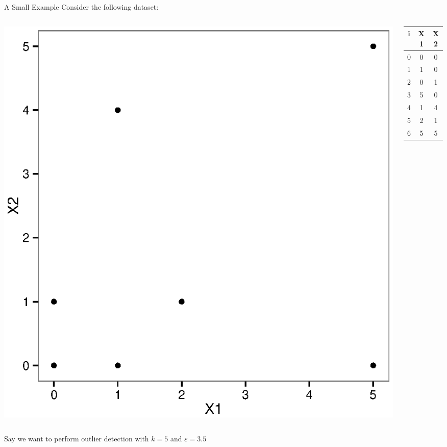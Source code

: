 \documentclass{beamer}
\begin{document}
\begin{frame}{A Small Example}
    Consider the following dataset:
    \begin{columns}
        \begin{column}{.7\textwidth}
            \includegraphics[width=.7\linewidth]{images/example_plot.eps}
        \end{column}
        \begin{column}{.3\textwidth}
            \begin{tabular}{ | c | c  c |}
            \hline
            i & X1 & X2 \\
            \hline
            0 & 0 & 0 \\
            1 & 1 & 0 \\
            2 & 0 & 1 \\
            3 & 5 & 0 \\
            4 & 1 & 4 \\
            5 & 2 & 1 \\
            6 & 5 & 5 \\
            \hline
            \end{tabular}
        \end{column}
    \end{columns}
    Say we want to perform outlier detection with $k=5$ and $\varepsilon=3.5$
\end{frame}
\end{document}
